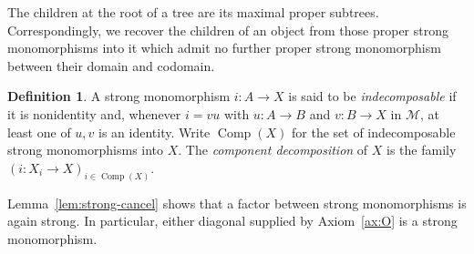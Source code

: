\documentclass[11pt,a4paper]{article}
\theoremstyle{plain}
\theoremstyle{definition}
\newtheorem{definition}[theorem]{Definition}
\theoremstyle{remark}
\newcommand{\Ocat}{\mathcal M}
\newcommand{\Comp}{\operatorname{Comp}}
\begin{document}
The children at the root of a tree are its maximal proper subtrees.
Correspondingly, we recover the children of an object from those
proper strong monomorphisms into it which admit no further proper
strong monomorphism between their domain and codomain.
\begin{definition}\label{def:components}
A strong monomorphism $i:A\to X$ is said to be
\emph{indecomposable} if it is nonidentity and, whenever
$i=vu$ with $u:A\to B$ and $v:B\to X$ in $\Ocat$, at least
one of $u,v$ is an identity.
Write $\Comp(X)$ for the set of indecomposable strong monomorphisms into $X$.
The \emph{component decomposition} of $X$ is the family
$(i:X_i\to X)_{i\in\Comp(X)}$.
\end{definition}

Lemma~\ref{lem:strong-cancel} shows that a factor between
strong monomorphisms is again strong. In particular, either
diagonal supplied by Axiom~\ref{ax:O} is a strong monomorphism.
\end{document}
